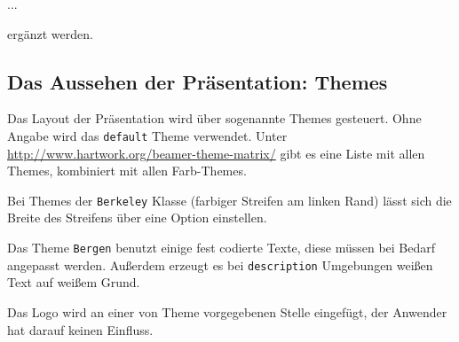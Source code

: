 \begin{lfgwcode}{}
{
...
}
\end{lfgwcode}

ergänzt werden.

\subsection{Das Aussehen der Präsentation: Themes}

Das Layout der Präsentation wird über sogenannte Themes gesteuert. Ohne
Angabe wird das \texttt{default} Theme verwendet. Unter
\url{http://www.hartwork.org/beamer-theme-matrix/} gibt es eine Liste mit
allen Themes, kombiniert mit allen Farb-Themes.

\begin{lfgwcode}{}
{
}
\end{lfgwcode}

Bei Themes der \texttt{Berkeley} Klasse (farbiger Streifen am linken Rand)
lässt sich die Breite des Streifens über eine Option einstellen.

Das Theme \texttt{Bergen} benutzt einige fest codierte Texte, diese müssen
bei Bedarf angepasst werden.  Außerdem erzeugt es bei \texttt{description}
Umgebungen weißen Text auf weißem Grund.

Das Logo wird an einer von Theme vorgegebenen Stelle eingefügt, der Anwender
hat darauf keinen Einfluss.

